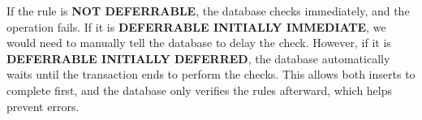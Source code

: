 \documentclass{article}
\begin{document}
If the rule is \textbf{NOT DEFERRABLE}, the database checks immediately, and the operation fails. If it is \textbf{DEFERRABLE INITIALLY IMMEDIATE}, we would need to manually tell the database to delay the check. However, if it is \textbf{DEFERRABLE INITIALLY DEFERRED}, the database automatically waits until the transaction ends to perform the checks. This allows both inserts to complete first, and the database only verifies the rules afterward, which helps prevent errors.
\end{document}
